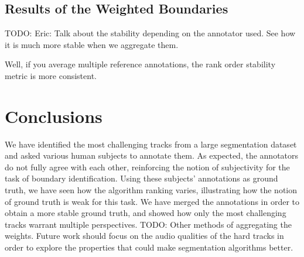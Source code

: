 \documentclass{article}
\begin{document}


\subsection{Results of the Weighted Boundaries}

TODO: Eric: Talk about the stability depending on the annotator used. See how it is much more stable when we aggregate them.

Well, if you average multiple reference annotations, the rank order stability metric is more consistent.



\section{Conclusions}

We have identified the most challenging tracks from a large segmentation dataset and asked various human subjects to annotate them.
As expected, the annotators do not fully agree with each other, reinforcing the notion of subjectivity for the task of boundary identification.
Using these subjects' annotations as ground truth, we have seen how the algorithm ranking varies, illustrating how the notion of ground truth is weak for this task.
We have merged the annotations in order to obtain a more stable ground truth, and showed how only the most challenging tracks warrant multiple perspectives.
TODO: Other methods of aggregating the weights.
Future work should focus on the audio qualities of the hard tracks in order to explore the properties that could make segmentation algorithms better.






\end{document}
